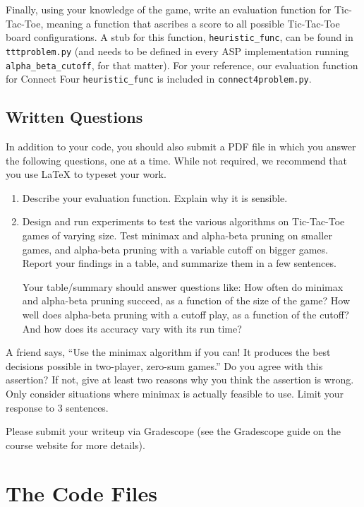 \documentclass{article}
\begin{document}
Finally, using your knowledge of the game, write an evaluation
function for Tic-Tac-Toe, meaning a function that ascribes a score to
all possible Tic-Tac-Toe board configurations.  A stub for this
function, \verb|heuristic_func|, can be found in \verb|tttproblem.py| (and needs to be defined in every ASP implementation running \verb|alpha_beta_cutoff|, for that matter).
%
For your reference,
our evaluation function for Connect Four \verb|heuristic_func| is included in \verb|connect4problem.py|.


\subsection{Written Questions}
In addition to your code, you should also submit a PDF file in which you
answer the following questions, one at a time.  While not required, we
recommend that you use \LaTeX{} to typeset your work.

\begin{enumerate}
  \item Describe your evaluation function. Explain why it is sensible.

  \item Design and run experiments to test the various algorithms on Tic-Tac-Toe games of varying size.
    Test minimax and alpha-beta pruning on smaller games,
    and alpha-beta pruning with a variable cutoff on bigger games.
    Report your findings in a table, and summarize them in a few sentences.

    Your table/summary should answer questions like:
    How often do minimax and alpha-beta pruning succeed,
    as a function of the size of the game?
    How well does alpha-beta pruning with a cutoff play, as a function of the cutoff?
    And how does its accuracy vary with its run time?
\end{enumerate}

A friend says, ``Use the minimax algorithm if you can!
It produces the best decisions possible in two-player, zero-sum games.''
Do you agree with this assertion?
If not, give at least two reasons why you think the assertion is wrong.
Only consider situations where minimax is actually feasible to use.
Limit your response to 3 sentences.
\fi

\noindent
Please submit your writeup via Gradescope (see the Gradescope guide on the course website for more details).

\section{The Code Files}
\end{document}
